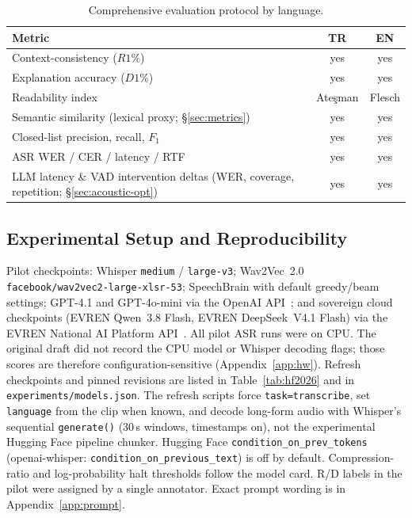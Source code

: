 \documentclass[conference]{IEEEtran}
\begin{document}
\begin{table}[t]
\caption{Comprehensive evaluation protocol by language.}
\label{tab:protocol}
\centering
\renewcommand{\arraystretch}{1.15}
\begin{tabular}{lcc}
\toprule
\textbf{Metric} & \textbf{TR} & \textbf{EN} \\
\midrule
Context-consistency ($R1\%$) & yes & yes \\
Explanation accuracy ($D1\%$) & yes & yes \\
Readability index & Ate\c{s}man & Flesch \\
Semantic similarity (lexical proxy; \S\ref{sec:metrics}) & yes & yes \\
Closed-list precision, recall, $F_1$ & yes & yes \\
ASR WER / CER / latency / RTF & yes & yes \\
LLM latency \& VAD intervention deltas (WER, coverage, repetition; \S\ref{sec:acoustic-opt}) & yes & yes \\
\bottomrule
\end{tabular}
\end{table}

\subsection{Experimental Setup and Reproducibility}

Pilot checkpoints: Whisper \texttt{medium} / \texttt{large-v3}; Wav2Vec~2.0 \texttt{facebook/wav2vec2-large-xlsr-53}; SpeechBrain with default greedy/beam settings; GPT-4.1 and GPT-4o-mini via the OpenAI API~\cite{openai2026}; and sovereign cloud checkpoints (EVREN Qwen~3.8 Flash, EVREN DeepSeek~V4.1 Flash) via the EVREN National AI Platform API~\cite{evren2026}. All pilot ASR runs were on CPU. The original draft did not record the CPU model or Whisper decoding flags; those scores are therefore configuration-sensitive (Appendix~\ref{app:hw}). Refresh checkpoints and pinned revisions are listed in Table~\ref{tab:hf2026} and in \texttt{experiments/models.json}. The refresh scripts force \texttt{task=transcribe}, set \texttt{language} from the clip when known, and decode long-form audio with Whisper's sequential \texttt{generate()} (30\,s windows, timestamps on), not the experimental Hugging Face pipeline chunker. Hugging Face \texttt{condition\_on\_prev\_tokens} (openai-whisper: \texttt{condition\_on\_previous\_text}) is off by default. Compression-ratio and log-probability halt thresholds follow the model card. R/D labels in the pilot were assigned by a single annotator. Exact prompt wording is in Appendix~\ref{app:prompt}.
\end{document}
